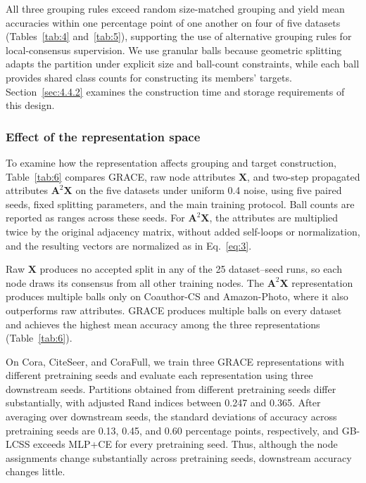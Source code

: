 \documentclass[times,review,10pt]{elsarticle}
\theoremstyle{definition}
\theoremstyle{plain}
\begin{document}
All three grouping rules exceed random size-matched grouping and yield mean accuracies within one percentage point of one another on four of five datasets (Tables~\ref{tab:4} and~\ref{tab:5}), supporting the use of alternative grouping rules for local-consensus supervision. We use granular balls because geometric splitting adapts the partition under explicit size and ball-count constraints, while each ball provides shared class counts for constructing its members' targets. Section~\ref{sec:4.4.2} examines the construction time and storage requirements of this design.

\subsubsection{Effect of the representation space}\label{sec:4.3.3}

To examine how the representation affects grouping and target construction, Table~\ref{tab:6} compares GRACE, raw node attributes \(\mathbf{X}\), and two-step propagated attributes \(\mathbf{A}^2\mathbf{X}\) on the five datasets under uniform 0.4 noise, using five paired seeds, fixed splitting parameters, and the main training protocol. Ball counts are reported as ranges across these seeds. For \(\mathbf{A}^2\mathbf{X}\), the attributes are multiplied twice by the original adjacency matrix, without added self-loops or normalization, and the resulting vectors are normalized as in Eq.~\eqref{eq:3}.



Raw \(\mathbf X\) produces no accepted split in any of the 25 dataset--seed runs, so each node draws its consensus from all other training nodes. The \(\mathbf A^2\mathbf X\) representation produces multiple balls only on Coauthor-CS and Amazon-Photo, where it also outperforms raw attributes. GRACE produces multiple balls on every dataset and achieves the highest mean accuracy among the three representations (Table~\ref{tab:6}).

On Cora, CiteSeer, and CoraFull, we train three GRACE representations with different pretraining seeds and evaluate each representation using three downstream seeds. Partitions obtained from different pretraining seeds differ substantially, with adjusted Rand indices \cite{ref74} between 0.247 and 0.365. After averaging over downstream seeds, the standard deviations of accuracy across pretraining seeds are 0.13, 0.45, and 0.60 percentage points, respectively, and GB-LCSS exceeds MLP+CE for every pretraining seed. Thus, although the node assignments change substantially across pretraining seeds, downstream accuracy changes little.
\end{document}
